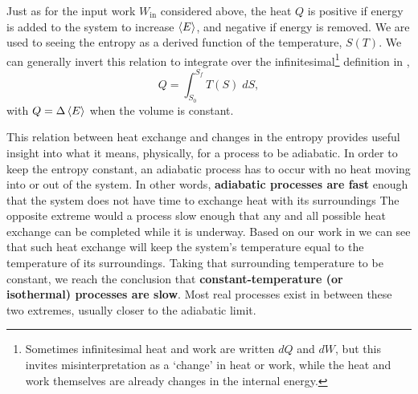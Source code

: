 Just as for the input work $W_{\text{in}}$ considered above, the heat $Q$ is positive if energy is added to the system to increase $\left\langle E \right\rangle$, and negative if energy is removed.
We are used to seeing the entropy as a derived function of the temperature, $S(T)$.
We can generally invert this relation to integrate over the infinitesimal\footnote{Sometimes infinitesimal heat and work are written $dQ$ and $dW$, but this invites misinterpretation as a `change' in heat or work, while the heat and work themselves are already changes in the internal energy.} definition in ,
\begin{equation}
  \label{eq:heat}
  Q = \int_{S_0}^{S_f} T(S) \; dS,
\end{equation}
with $Q = \Delta \left\langle E \right\rangle$ when the volume is constant.

This relation between heat exchange and changes in the entropy provides useful insight into what it means, physically, for a process to be adiabatic.
In order to keep the entropy constant, an adiabatic process has to occur with no heat moving into or out of the system.
In other words, \textbf{adiabatic processes are fast} enough that the system does not have time to exchange heat with its surroundings 
The opposite extreme would a process slow enough that any and all possible heat exchange can be completed while it is underway.
Based on our work in  we can see that such heat exchange will keep the system's temperature equal to the temperature of its surroundings.
Taking that surrounding temperature to be constant, we reach the conclusion that \textbf{constant-temperature (or isothermal) processes are slow}.
Most real processes exist in between these two extremes, usually closer to the adiabatic limit.



